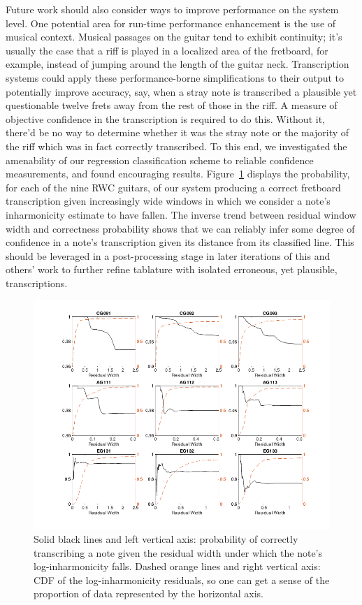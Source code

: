 \documentclass[12pt]{cmuthesis}
\begin{document}
Future work should also consider ways to improve performance on the system level. One potential area for run-time performance enhancement is the use of musical context. Musical passages on the guitar tend to exhibit continuity; it's usually the case that a riff is played in a localized area of the fretboard, for example, instead of jumping around the length of the guitar neck. Transcription systems could apply these performance-borne simplifications to their output to potentially improve accuracy, say, when a stray note is transcribed a plausible yet questionable twelve frets away from the rest of those in the riff. A measure of objective confidence in the transcription is required to do this. Without it, there'd be no way to determine whether it was the stray note or the majority of the riff which was in fact correctly transcribed. To this end, we investigated the amenability of our regression classification scheme to reliable confidence measurements, and found encouraging results. Figure~\ref{fig:p-correct-res} displays the probability, for each of the nine RWC guitars, of our system producing a correct fretboard transcription given increasingly wide windows in which we consider a note's inharmonicity estimate to have fallen. The inverse trend between residual window width and correctness probability shows that we can reliably infer some degree of confidence in a note's transcription given its distance from its classified line. This should be leveraged in a post-processing stage in later iterations of this and others' work to further refine tablature with isolated erroneous, yet plausible, transcriptions.

\begin{figure}[!htbp] 
\centering
\includegraphics[angle=90,scale=0.65]{p-correct-res}
\caption{Solid black lines and left vertical axis: probability of correctly transcribing a note given the residual width under which the note's log-inharmonicity falls. Dashed orange lines and right vertical axis: CDF of the log-inharmonicity residuals, so one can get a sense of the proportion of data represented by the horizontal axis.}
\label{fig:p-correct-res}
\end{figure} 
\end{document}
